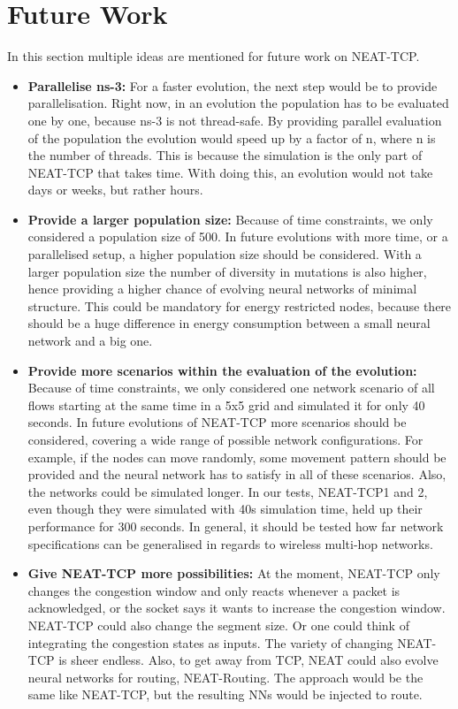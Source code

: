 \section{Future Work}\label{sec:futureWork}
In this section multiple ideas are mentioned for future work on NEAT-TCP.
\begin{itemize}
	\item{\textbf{Parallelise ns-3:} For a faster evolution, the next step would be to provide parallelisation. Right now, in an evolution the population has to be evaluated one by one, because ns-3 is not thread-safe. By providing parallel evaluation of the population the evolution would speed up by a factor of n, where n is the number of threads. This is because the simulation is the only part of NEAT-TCP that takes time. With doing this, an evolution would not take days or weeks, but rather hours.}
	\item{\textbf{Provide a larger population size:} Because of time constraints, we only considered a population size of 500. In future evolutions with more time, or a parallelised setup, a higher population size should be considered. With a larger population size the number of diversity in mutations is also higher, hence providing a higher chance of evolving neural networks of minimal structure. This could be mandatory for energy restricted nodes, because there should be a huge difference in energy consumption between a small neural network and a big one.}
	\item{\textbf{Provide more scenarios within the evaluation of the evolution:} Because of time constraints, we only considered one network scenario of all flows starting at the same time in a 5x5 grid and simulated it for only 40 seconds. In future evolutions of NEAT-TCP more scenarios should be considered, covering a wide range of possible network configurations. For example, if the nodes can move randomly, some movement pattern should be provided and the neural network has to satisfy in all of these scenarios. Also, the networks could be simulated longer. In our tests, NEAT-TCP1 and 2, even though they were simulated with 40s simulation time, held up their performance for 300 seconds. In general, it should be tested how far network specifications can be generalised in regards to wireless multi-hop networks.}
	\item{\textbf{Give NEAT-TCP more possibilities:} At the moment, NEAT-TCP only changes the congestion window and only reacts whenever a packet is acknowledged, or the socket says it wants to increase the congestion window. NEAT-TCP could also change the segment size. Or one could think of integrating the congestion states as inputs. The variety of changing NEAT-TCP is sheer endless. Also, to get away from TCP, NEAT could also evolve neural networks for routing, NEAT-Routing. The approach would be the same like NEAT-TCP, but the resulting NNs would be injected to route.}

\end{itemize}
